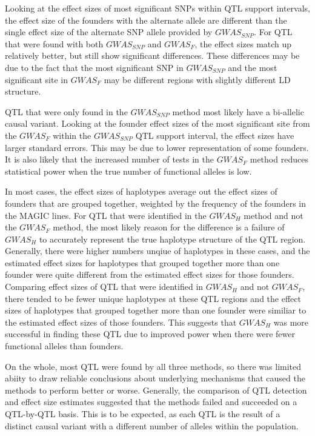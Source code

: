 \documentclass[article,9pt,twocolumn,twoside]{rilabRxiv}
\begin{document}
Looking at the effect sizes of most significant SNPs within QTL support intervals, the effect size of the founders with the alternate allele are different than the single effect size of the alternate SNP allele provided by $GWAS_{SNP}$. For QTL that were found with both $GWAS_{SNP}$ and $GWAS_F$, the effect sizes match up relatively better, but still show significant differences. These differences may be due to the fact that the most significant SNP in $GWAS_{SNP}$ and the most significant site in $GWAS_F$ may be different regions with slightly different LD structure.

QTL that were only found in the $GWAS_{SNP}$ method most likely have a bi-allelic causal variant. Looking at the founder effect sizes of the most significant site from the $GWAS_F$ within the $GWAS_{SNP}$ QTL support interval, the effect sizes have larger standard errors. This may be due to lower representation of some founders. It is also likely that the increased number of tests in the $GWAS_F$ method reduces statistical power when the true number of functional alleles is low.

In most cases, the effect sizes of haplotypes average out the effect sizes of founders that are grouped together, weighted by the frequency of the founders in the MAGIC lines. For QTL that were identified in the $GWAS_H$ method and not the $GWAS_F$ method, the most likely reason for the difference is a failure of $GWAS_H$ to accurately represent the true haplotype structure of the QTL region. Generally, there were higher numbers unqiue of haplotypes in these cases, and the estimated effect sizes for haplotypes that grouped together more than one founder were quite different from the estimated effect sizes for those founders. Comparing effect sizes of QTL that were identified in $GWAS_H$ and not $GWAS_F$, there tended to be fewer unique haplotypes at these QTL regions and the effect sizes of haplotypes that grouped together more than one founder were similiar to the estimated effect sizes of those founders. This suggests that $GWAS_H$ was more successful in finding these QTL due to improved power when there were fewer functional alleles than founders.

On the whole, most QTL were found by all three methods, so there was limited abiity to draw reliable conclusions about underlying mechanisms that caused the methods to perform better or worse. Generally, the comparison of QTL detection and effect size estimates suggested that the methods failed and succeeded on a QTL-by-QTL basis. This is to be expected, as each QTL is the result of a distinct causal variant with a different number of alleles within the population.
\end{document}
